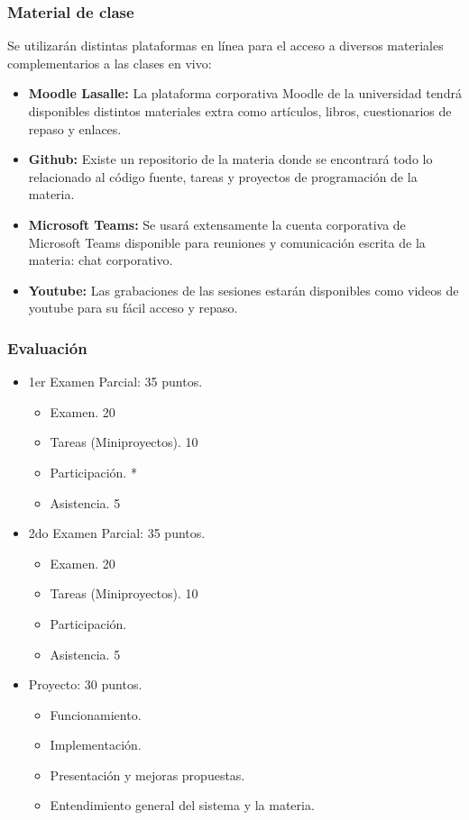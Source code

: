 \documentclass[10pt]{beamer}
\begin{document}
\begin{frame}
    \frametitle{Material de clase}
    Se utilizarán distintas plataformas en línea para el acceso a diversos materiales complementarios a las clases en vivo:
    \begin{itemize}
        \item \textbf{Moodle Lasalle:} La plataforma corporativa Moodle de la universidad tendrá disponibles distintos materiales extra como artículos, libros, cuestionarios de repaso y enlaces.
        \item \textbf{Github:} Existe un repositorio de la materia donde se encontrará todo lo relacionado al código fuente, tareas y proyectos de programación de la materia.
        \item \textbf{Microsoft Teams: }Se usará extensamente la cuenta corporativa de Microsoft Teams disponible para reuniones y comunicación escrita de la materia: chat corporativo.
        \item \textbf{Youtube:} Las grabaciones de las sesiones estarán disponibles como videos de youtube para su fácil acceso y repaso.
    \end{itemize}
\end{frame}

\begin{frame}
    \frametitle{Evaluación}
    \begin{itemize}
        \item 1er Examen Parcial: \alert{35 puntos}.
            \begin{itemize}
                \item Examen. \alert{20}
                \item Tareas (Miniproyectos). \alert{10}
                \item Participación. *
                \item Asistencia. \alert{5}
            \end{itemize}
        \item 2do Examen Parcial: \alert{35 puntos}.
            \begin{itemize}
                \item Examen. \alert{20}
                \item Tareas (Miniproyectos). \alert{10}
                \item Participación.
                \item Asistencia. \alert{5}
            \end{itemize}
        \item Proyecto: \alert{30 puntos}.
            \begin{itemize}
                \item Funcionamiento.
                \item Implementación.
                \item Presentación y mejoras propuestas.
                \item Entendimiento general del sistema y la materia.
            \end{itemize}
    \end{itemize}
\end{frame}
\end{document}
